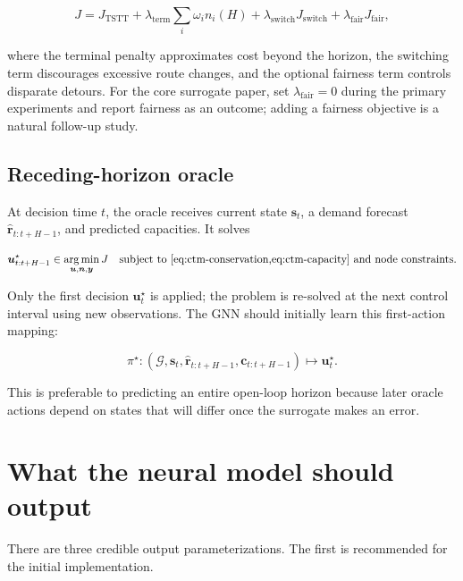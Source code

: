 \documentclass[11pt]{article}
\newcommand{\G}{\mathcal{G}}
\newcommand{\argmin}{\operatorname*{arg\,min}}
\newcommand{\vect}[1]{\bm{#1}}
\begin{document}
\begin{equation}
  J = J_{\mathrm{TSTT}}
      + \lambda_{\mathrm{term}}
        \sum_i \omega_i n_i(H)
      + \lambda_{\mathrm{switch}}J_{\mathrm{switch}}
      + \lambda_{\mathrm{fair}}J_{\mathrm{fair}},
  \label{eq:full-objective}
\end{equation}

where the terminal penalty approximates cost beyond the horizon, the switching term
discourages excessive route changes, and the optional fairness term controls disparate
detours.  For the core surrogate paper, set \(\lambda_{\mathrm{fair}}=0\) during the
primary experiments and report fairness as an outcome; adding a fairness objective is
a natural follow-up study.

\subsection{Receding-horizon oracle}

At decision time \(t\), the oracle receives current state \(\vect{s}_t\), a demand
forecast \(\widehat{\vect{r}}_{t:t+H-1}\), and predicted capacities.  It solves

\begin{equation}
  \vect{u}_{t:t+H-1}^{\star}
  \in
  \argmin_{\vect{u},\vect{n},\vect{y}} J
  \quad\text{subject to \cref{eq:ctm-conservation,eq:ctm-capacity} and node constraints.}
  \label{eq:oracle}
\end{equation}

Only the first decision \(\vect{u}_t^\star\) is applied; the problem is re-solved at
the next control interval using new observations.  The GNN should initially learn this
first-action mapping:

\begin{equation}
  \pi^\star:
  (\G,\vect{s}_t,\widehat{\vect{r}}_{t:t+H-1},\vect{c}_{t:t+H-1})
  \mapsto \vect{u}_t^\star.
  \label{eq:first-action-map}
\end{equation}

This is preferable to predicting an entire open-loop horizon because later oracle
actions depend on states that will differ once the surrogate makes an error.

\section{What the neural model should output}

There are three credible output parameterizations.  The first is recommended for the
initial implementation.
\end{document}
